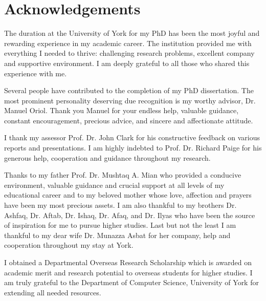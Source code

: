 \chapter*{Acknowledgements}
The duration at the University of York for my PhD has been the most joyful and rewarding experience in my academic career. The institution provided me with everything I needed to thrive: challenging research problems, excellent company and supportive environment. I am deeply grateful to all those who shared this experience with me. 

Several people have contributed to the completion of my PhD dissertation. The most prominent personality deserving due recognition is my worthy advisor, Dr. Manuel Oriol. Thank you Manuel for your endless help, valuable guidance, constant encouragement, precious advice, and sincere and affectionate attitude.

I thank my assessor Prof. Dr. John Clark for his constructive feedback on various reports and presentations. I am highly indebted to Prof. Dr. Richard Paige for his generous help, cooperation and guidance throughout my research.

Thanks to my father Prof. Dr. Mushtaq A. Mian who provided a conducive environment, valuable guidance and crucial support at all levels of my educational career and to my beloved mother whose love, affection and prayers have been my most precious assets. I am also thankful to my brothers Dr. Ashfaq, Dr. Aftab, Dr. Ishaq, Dr. Afaq, and Dr. Ilyas who have been the source of inspiration for me to pursue higher studies. Last but not the least I am thankful to my dear wife Dr. Munazza Asbat for her company, help and cooperation throughout my stay at York.

I obtained a Departmental Overseas Research Scholarship which is awarded on academic merit and research potential to overseas students for higher studies. I am truly grateful to the Department of Computer Science, University of York for extending all needed resources.
